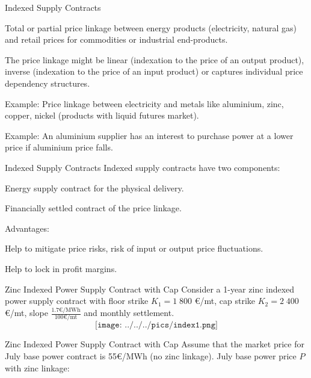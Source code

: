 {Indexed Supply Contracts}






	Total or partial price linkage between energy products (electricity, natural gas) and retail prices for commodities or industrial end-products.


	The price linkage might be linear (indexation to the price of an output product), inverse (indexation to the price of an input product) or captures individual price dependency structures.


	Example: Price linkage between electricity and metals like aluminium, zinc, copper, nickel (products with liquid futures market).


	Example: An aluminium supplier has an interest to purchase power at a lower price if aluminium price falls.





{Indexed Supply Contracts}
Indexed supply contracts have two components:






	Energy supply contract for the physical delivery.


	Financially settled contract of the price linkage.




\vspace{0.5cm}
Advantages:






	Help to mitigate price risks, risk of input or output price fluctuations.


	Help to lock in profit margins.





{Zinc Indexed Power Supply Contract with Cap}
Consider a 1-year zinc indexed power supply contract with floor strike $K_1=1\;800$ €/mt, cap strike $K_2=2\;400$ €/mt, slope $\frac{1.7\text{€/MWh}}{100\text{€/mt}}$ and monthly settlement.
$$\texttt{[image: ../../../pics/index1.png]}$$

{Zinc Indexed Power Supply Contract with Cap}
Assume that the market price for July base power contract is \textcolor[rgb]{1.00,0.00,0.00}{55€/MWh} (no zinc linkage). July base power price $P$ with zinc linkage:\\
\vspace{0.2cm}


